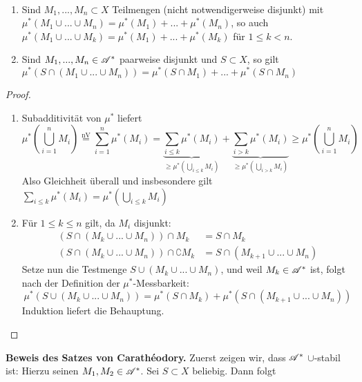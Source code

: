 \begin{lemma}\
\begin{enumerate}[label=(\roman*),topsep=3pt, itemsep=0pt]
\item Sind $M_1,...,M_n \subset X$ Teilmengen (nicht notwendigerweise disjunkt) mit $\mu^*(M_1\cup...\cup M_n)=\mu^*(M_1)+...+\mu^*(M_n)$, so auch $\mu^*(M_1 \cup ... \cup M_k) = \mu^*(M_1) + ... +\mu^*(M_k)$ für $1 \leq k <n$.
\item Sind $M_1,...,M_n \in \AA^*$ paarweise disjunkt und $S\subset X$, so gilt $\mu^*(S\cap(M_1 \cup ... \cup M_n)) = \mu^*(S \cap M_1) + ... +\mu^*(S \cap M_n)$
\end{enumerate}
\begin{proof}
\begin{enumerate}[label=(\roman*),topsep=3pt, itemsep=0pt]
	\item Subadditivität von $\mu^*$ liefert
	\begin{equation*}
	\mu^*\left( \bigcup_{i=1}^n M_i \right) \overset{\text{nV}}= \sum_{i=1}^n \mu^*(M_i)= \underbrace{\sum_{i\leq k} \mu^*(M_i)}_{\geq \mu^*\left(\bigcup\limits_{i\leq k} M_i\right)}+\underbrace{\sum_{i>k}\mu^*(M_i)}_{\geq \mu^*\left(\bigcup\limits_{i> k} M_i\right)} \geq \mu^*\left( \bigcup_{i=1}^n M_i \right)
	\end{equation*}
	Also Gleichheit überall und insbesondere gilt $\sum\limits_{i\leq k} \mu^*(M_i)=\mu^* \left(\bigcup\limits_{i\leq k} M_i \right)$
	\item Für $1 \leq k \leq n$ gilt, da $M_i$ disjunkt:
	\begin{equation*}
		\begin{split}
			(S\cap (M_k \cup ... \cup M_n))\cap M_k &= S \cap M_k \\
			(S\cap (M_k \cup ... \cup M_n))\cap \complement M_k &= S \cap (M_{k+1}\cup...\cup M_n)
		\end{split}
	\end{equation*}
	Setze nun die Testmenge $S \cup (M_k \cup ... \cup M_n)$, und weil $M_k \in \AA^*$ ist, folgt nach der Definition der $\mu^*$-Messbarkeit:
	$$\mu^*(S \cup (M_k \cup ... \cup M_n)) = \mu^*(S \cap M_k) + \mu^*(S \cap (M_{k+1}\cup...\cup M_n))$$
	Induktion liefert die Behauptung.
\end{enumerate}
\end{proof}
\end{lemma}
\textbf{Beweis des Satzes von Carathéodory.} Zuerst zeigen wir, dass $\AA^*$ $\cup$-stabil ist: Hierzu seinen $M_1, M_2 \in \AA^*$. Sei $S \subset X$ beliebig. Dann folgt
